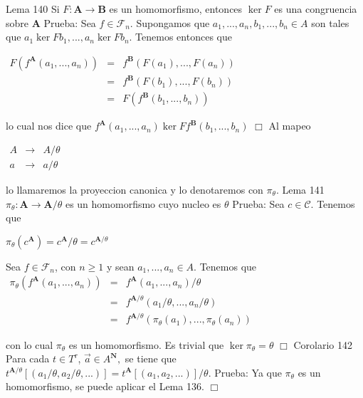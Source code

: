 Lema 140 Si \(F:\mathbf{A}\rightarrow \mathbf{B}\) es un homomorfismo, entonces \(\ker F\) es una congruencia sobre \(\mathbf{A}\)
Prueba: Sea \(f\in \mathcal{F}_{n}\). Supongamos que \(a_{1},...,a_{n},b_{1},...,b_{n} \in A\) son tales que \(a_{1}\ker Fb_{1},...,a_{n}\ker Fb_{n}\). Tenemos entonces que

\(\displaystyle \begin{array}{ccl} F(f^{\mathbf{A}}(a_{1},...,a_{n})) & = & f^{\mathbf{B} }(F(a_{1}),...,F(a_{n})) \\ & = & f^{\mathbf{B}}(F(b_{1}),...,F(b_{n})) \\ & = & F(f^{\mathbf{B}}(b_{1},...,b_{n})) \end{array} \)

lo cual nos dice que \(f^{\mathbf{A}}(a_{1},...,a_{n})\ker Ff^{\mathbf{B} }(b_{1},...,b_{n})\) \(\Box\)
Al mapeo

\(\displaystyle \begin{array}{lll} A & \rightarrow & A/\theta \\ a & \rightarrow & a/\theta \end{array} \)

lo llamaremos la proyeccion canonica y lo denotaremos con \(\pi _{\theta }\).
Lema 141 \(\pi _{\theta }:\mathbf{A}\rightarrow \mathbf{A}/\theta \) es un homomorfismo cuyo nucleo es \(\theta \)
Prueba: Sea \(c\in \mathcal{C}\). Tenemos que

\(\displaystyle \pi _{\theta }(c^{\mathbf{A}})=c^{\mathbf{A}}/\theta =c^{\mathbf{A}/\theta } \)

Sea \(f\in \mathcal{F}_{n}\), con \(n\geq 1\) y sean \(a_{1},...,a_{n}\in A\). Tenemos que
\(\displaystyle \begin{array}{ccl} \pi _{\theta }(f^{\mathbf{A}}(a_{1},...,a_{n})) & = & f^{\mathbf{A} }(a_{1},...,a_{n})/\theta \\ & = & f^{\mathbf{A}/\theta }(a_{1}/\theta ,...,a_{n}/\theta ) \\ & = & f^{\mathbf{A}/\theta }(\pi _{\theta }(a_{1}),...,\pi _{\theta }(a_{n})) \end{array} \)

con lo cual \(\pi _{\theta }\) es un homomorfismo. Es trivial que \(\ker \pi _{\theta }=\theta \) \(\Box\)
Corolario 142 Para cada \(t\in T^{\tau }\), \(\vec{a}\in A^{\mathbf{N} },\) se tiene que \(t^{\mathbf{A}/\theta }[(a_{1}/\theta ,a_{2}/\theta ,...)]=t^{\mathbf{A}}[(a_{1},a_{2},...)]/\theta .\)
Prueba: Ya que \(\pi _{\theta }\) es un homomorfismo, se puede aplicar el Lema 136. \(\Box\)

